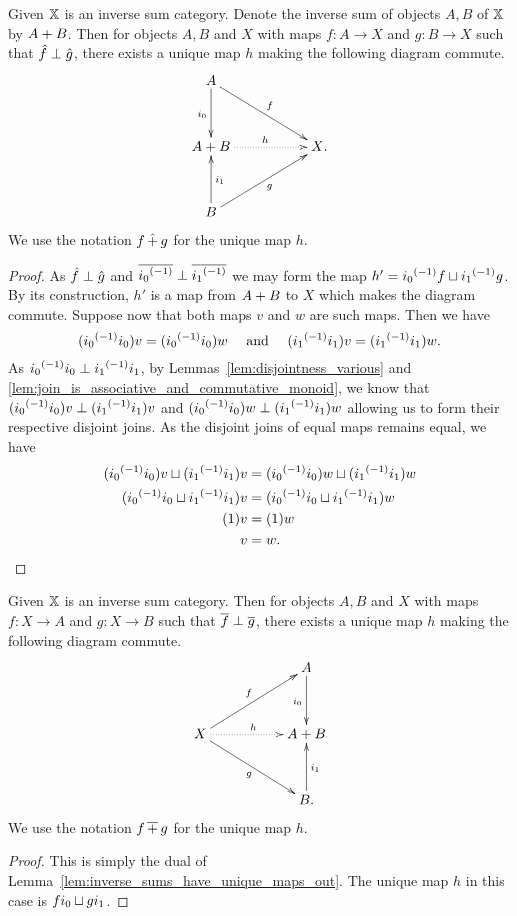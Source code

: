 \begin{lemma}\label{lem:inverse_sums_have_unique_maps_out}
  Given $\mathbb{X}$ is an inverse sum category. Denote the inverse sum of objects $A,B$ of $\mathbb{X}$ by
  ${{A}+{B}}$. Then for objects $A,B$ and $X$ with maps $f:A\to X$ and $g:B\to X$ such that
  $\hat{f} \perp \hat{g}$, there exists a unique map $h$ making the following diagram commute.
  \[
    \xymatrix@R+10pt@C+28pt {
      A \ar[dr]^{f} \ar[d]_{i_0}
        \\
      \invsum{A}{B} \ar@{.>}[r]^{h}
        & X\text{.}\\
      B \ar[ur]_{g} \ar[u]_{i_1}
    }
  \]
  We use the notation $f\operatorname{\hat{+}} g$ for the unique map $h$.
\end{lemma}
\begin{proof}
  As $\hat{f} \perp \hat{g}$ and $\overline{{i_0}^{(-1)}} \perp \overline{{i_1}^{(-1)}}$ we may form the map $h'
  = {i_0}^{(-1)}f \sqcup {i_1}^{(-1)}g$. By its construction, $h'$ is a map from ${{A}+{B}}$ to $X$
  which makes the diagram commute. Suppose now that both maps $v$ and $w$ are such maps. Then we
  have
  \[
    ({i_0}^{(-1)}i_0) v = ({i_0}^{(-1)}i_0) w \quad\text{ and }\quad({i_1}^{(-1)}i_1) v = ({i_1}^{(-1)}i_1) w.
  \]
  As ${i_0}^{(-1)}i_0 \perp {i_1}^{(-1)}i_1$, by Lemmas~\ref{lem:disjointness_various} and
  \ref{lem:join_is_associative_and_commutative_monoid}, we know that $({i_0}^{(-1)}i_0) v \perp
  ({i_1}^{(-1)}i_1) v$ and $({i_0}^{(-1)}i_0) w \perp ({i_1}^{(-1)}i_1) w$ allowing us to form their
  respective disjoint joins. As the disjoint joins of equal maps remains equal, we have
  \begin{align*}
    ({i_0}^{(-1)}i_0) v \sqcup ({i_1}^{(-1)}i_1) v &=     ({i_0}^{(-1)}i_0) w \sqcup ({i_1}^{(-1)}i_1) w \\
    ({i_0}^{(-1)}i_0 \sqcup {i_1}^{(-1)}i_1 )v &=     ({i_0}^{(-1)}i_0 \sqcup {i_1}^{(-1)}i_1) w \\
    (1 )v &=     (1) w \\
        v &=  w.
  \end{align*}
\end{proof}

\begin{corollary}\label{cor:inverse_sums_have_unique_maps_in}
  Given $\mathbb{X}$ is an inverse sum category. Then for objects $A,B$ and $X$ with maps $f:X\to A$
  and $g:X\to B$ such that
  $\overline{f} \perp \overline{g}$, there exists a unique map $h$ making the following diagram commute.
  \[
    \xymatrix@R+10pt@C+28pt {
      &A \ar[d]_{i_0}
        \\
      X   \ar[dr]_{g} \ar[ur]^{f}  \ar@{.>}[r]^{h} & \invsum{A}{B}\\
      & B \ar[u]_{i_1}\text{.}
    }
  \]
  We use the notation $f\operatorname{\overline{+}} g$ for the unique map $h$.
\end{corollary}
\begin{proof}
  This is simply the dual of Lemma~\ref{lem:inverse_sums_have_unique_maps_out}. The unique map $h$
  in this case is $f i_0 \sqcup g i_1$.
\end{proof}

